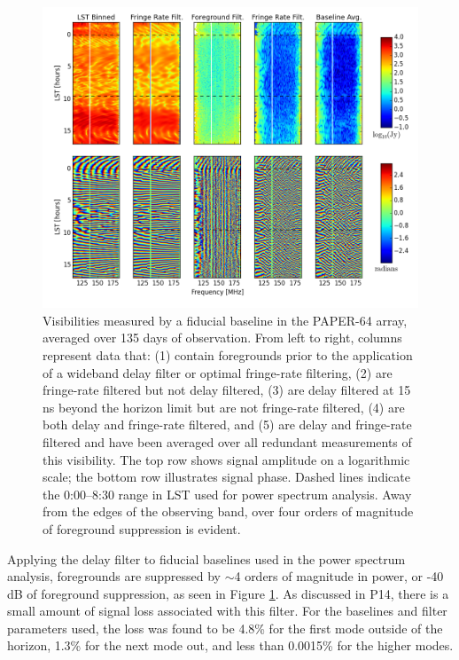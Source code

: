 \documentclass[twocolumn,numberedappendix]{emulateapj} \shorttitle{New Limits on the 21 cm Power Spectrum at $z=8.4$}
\begin{document}
\begin{figure}
\centering
\includegraphics[width=2\columnwidth]{plots/waterfalls_labeled.png}
\caption{
Visibilities measured by a fiducial baseline in the PAPER-64 array, 
averaged over 135 days of observation.  From left to right, columns represent
data that: (1) contain foregrounds prior to the application of a wideband
delay filter or optimal fringe-rate filtering, (2) are fringe-rate filtered but
not delay filtered, (3) are delay filtered at 15 ns beyond the horizon limit but
are not fringe-rate filtered, (4) are both delay and fringe-rate filtered,
and (5) are delay and fringe-rate filtered and have been averaged over all
redundant measurements of this visibility.  The top row shows signal amplitude
on a logarithmic scale; the bottom row illustrates signal phase.
Dashed lines indicate the 0:00--8:30 range in LST used for power
spectrum analysis.  Away from the edges of the observing band, over four orders 
of magnitude of foreground suppression is evident.
} \label{fig:waterfalls}
\end{figure}

Applying the delay filter to fiducial baselines used in the power spectrum analysis,
foregrounds are suppressed by $\sim$4 orders of magnitude in power, or
 -40 dB of foreground suppression, as seen in Figure
\ref{fig:waterfalls}. As discussed in P14, there is a small amount of signal loss
associated with this filter. For the baselines and filter parameters used, the loss was found to be 4.8\% for the
first mode outside of the horizon, 1.3\% for the next mode out, and less than
0.0015\% for the higher modes.  
\end{document}
